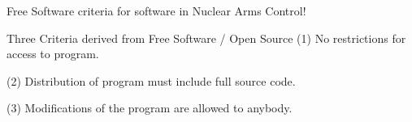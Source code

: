 \documentclass[presentation]{beamer}
\begin{document}
\begin{frame}[label=sec-3-5]{}

\begin{center}\Large
Free Software criteria for software in Nuclear Arms Control!
\end{center}

\begin{exampleblock}{Three Criteria derived from Free Software / Open Source}
(1) No restrictions for access to program.

(2) Distribution of program must include full source code.

(3) Modifications of the program are allowed to anybody.
\end{exampleblock}

\hfill
\hfill


\begin{columns}
\begin{column}{0.45\textwidth}


\end{column}
\end{columns}
\end{frame}
\end{document}
